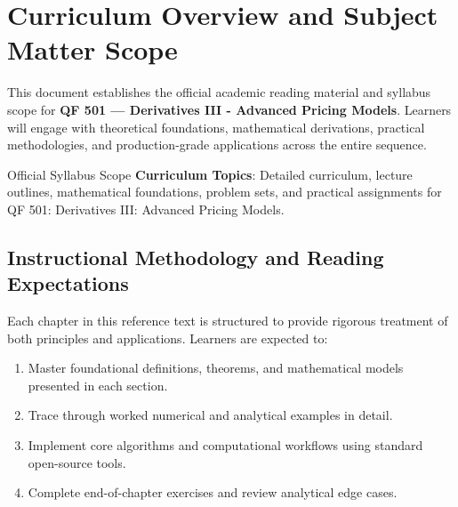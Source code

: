 \section{Curriculum Overview and Subject Matter Scope}

This document establishes the official academic reading material and syllabus scope for \textbf{QF 501 --- Derivatives III - Advanced Pricing Models}. Learners will engage with theoretical foundations, mathematical derivations, practical methodologies, and production-grade applications across the entire sequence.

\begin{InsightBox}{Official Syllabus Scope}
  \textbf{Curriculum Topics}: Detailed curriculum, lecture outlines, mathematical foundations, problem sets, and practical assignments for QF 501: Derivatives III: Advanced Pricing Models.
\end{InsightBox}

\subsection{Instructional Methodology and Reading Expectations}

Each chapter in this reference text is structured to provide rigorous treatment of both principles and applications. Learners are expected to:
\begin{enumerate}
  \item Master foundational definitions, theorems, and mathematical models presented in each section.
  \item Trace through worked numerical and analytical examples in detail.
  \item Implement core algorithms and computational workflows using standard open-source tools.
  \item Complete end-of-chapter exercises and review analytical edge cases.
\end{enumerate}

